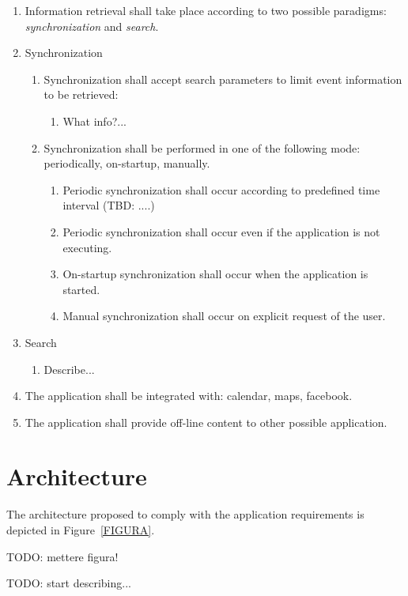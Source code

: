 \documentclass[10pt, twoside]{article}
\begin{document}
\begin{enumerate}
\begin{enumerate}
    \end{enumerate}
    \item Information retrieval shall take place according to two possible 
          paradigms: \emph{synchronization} and \emph{search}.
    \item Synchronization
    \begin{enumerate}
        \item Synchronization shall accept search parameters to limit
              event information to be retrieved:
        \begin{enumerate}
            \item What info?...
        \end{enumerate}
        \item Synchronization shall be performed in one of the following mode:
              periodically, on-startup, manually.
        \begin{enumerate}
            \item Periodic synchronization shall occur according 
                  to predefined time interval (TBD: ....)
            \item Periodic synchronization shall occur even if the application
                  is not executing.
            \item On-startup synchronization shall occur when the application is
                  started.
            \item Manual synchronization shall occur on explicit request of the
                  user.
        \end{enumerate}
    \end{enumerate}
    \item Search
    \begin{enumerate}
        \item Describe...
    \end{enumerate}
    \item The application shall be integrated with: calendar, maps, facebook.
    \item The application shall provide off-line content to other possible
          application.
\end{enumerate}

\section{Architecture}
The architecture proposed to comply with the application requirements
is depicted in Figure~\ref{FIGURA}. 

TODO: mettere figura!


TODO: start describing...
\end{document}
